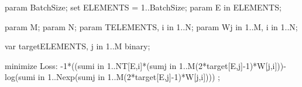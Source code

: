 param BatchSize;
set ELEMENTS = 1..BatchSize;
param E in ELEMENTS;

param M;
param N;
param T{ELEMENTS, i in 1..N};
param W{j in 1..M, i in 1..N};

var target{ELEMENTS, j in 1..M} binary;

minimize Loss:
	-1*((sum{i in 1..N}T[E,i]*(sum{j in 1..M}(2*target[E,j]-1)*W[j,i]))-log(sum{i in 1..N}exp(sum{j in 1..M}(2*target[E,j]-1)*W[j,i]))) ;